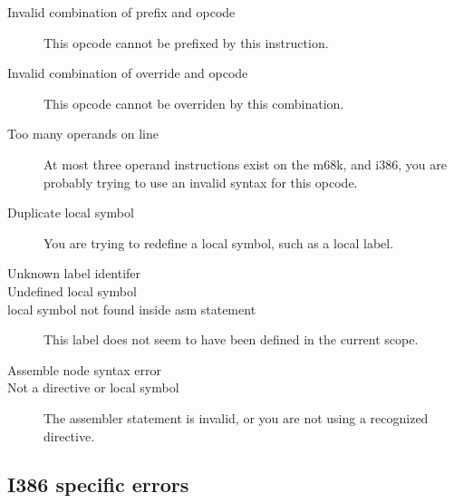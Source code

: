 \begin{description}
\item [Invalid combination of prefix and opcode]
This opcode cannot be prefixed by this instruction.

\item [Invalid combination of override and opcode]
This opcode cannot be overriden by this combination.

\item [Too many operands on line]
At most three operand instructions exist on the m68k, and i386, you
are probably trying to use an invalid syntax for this opcode.

\item [Duplicate local symbol]
You are trying to redefine a local symbol, such as a local label.

\item [Unknown label identifer]
\item [Undefined local symbol]
\item [local symbol not found inside asm statement]
This label does not seem to have been defined in the current scope.


\item [Assemble node syntax error]
\item [Not a directive or local symbol]
The assembler statement is invalid, or you are not using a recognized
directive.

\end{description}

\subsection{I386 specific errors}

